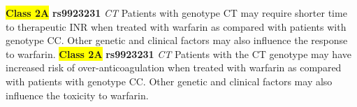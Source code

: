\documentclass{book}
\begin{document}
\begin{center}


\textbf{\colorbox{yellow} {Class 2A}} \textbf{ rs9923231 } \textit{ CT }
Patients with genotype CT may require shorter time to therapeutic INR when treated with warfarin as compared with patients with genotype CC. Other genetic and clinical factors may also influence the response to warfarin. \textbf{\colorbox{yellow} {Class 2A}} \textbf{ rs9923231 } \textit{ CT }
Patients with the CT genotype may have increased risk of over-anticoagulation when treated with warfarin as compared with patients with genotype CC. Other genetic and clinical factors may also influence the toxicity to warfarin.


\end{center}

















































\newpage

\end{document}
